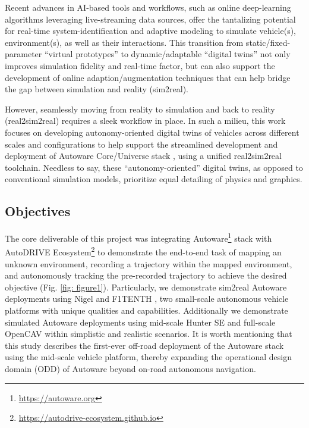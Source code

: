 Recent advances in AI-based tools and workflows, such as online deep-learning algorithms leveraging live-streaming data sources, offer the tantalizing potential for real-time system-identification and adaptive modeling to simulate vehicle(s), environment(s), as well as their interactions. This transition from static/fixed-parameter ``virtual prototypes'' to dynamic/adaptable ``digital twins'' not only improves simulation fidelity and real-time factor, but can also support the development of online adaption/augmentation techniques that can help bridge the gap between simulation and reality (sim2real).

However, seamlessly moving from reality to simulation and back to reality (real2sim2real) \cite{Real2Sim2Real} requires a sleek workflow in place. In such a milieu, this work focuses on developing autonomy-oriented digital twins of vehicles across different scales and configurations to help support the streamlined development and deployment of Autoware Core/Universe stack \cite{AutowareCore, AutowareUniverse, AutowareStack}, using a unified real2sim2real toolchain. Needless to say, these ``autonomy-oriented'' digital twins, as opposed to conventional simulation models, prioritize equal detailing of physics and graphics.

\hypertarget{Objectives}{%
\subsection{Objectives}\label{Objectives}}

The core deliverable of this project was integrating Autoware\footnote{\url{https://autoware.org}} \cite{Autoware} stack with AutoDRIVE Ecosystem\footnote{\url{https://autodrive-ecosystem.github.io}} \cite{AutoDRIVEEcosystem, AutoDRIVESimulator, AutoDRIVEReport, AutoDRIVESimulatorReport} to demonstrate the end-to-end task of mapping an unknown environment, recording a trajectory within the mapped environment, and autonomously tracking the pre-recorded trajectory to achieve the desired objective (Fig. \ref{fig: figure1}). Particularly, we demonstrate sim2real Autoware deployments using Nigel \cite{Nigel} and F1TENTH \cite{F1TENTH}, two small-scale autonomous vehicle platforms with unique qualities and capabilities. Additionally we demonstrate simulated Autoware deployments using mid-scale Hunter SE \cite{HunterSE} and full-scale OpenCAV \cite{OpenCAV} within simplistic and realistic scenarios. It is worth mentioning that this study describes the first-ever off-road deployment of the Autoware stack using the mid-scale vehicle platform, thereby expanding the operational design domain (ODD) of Autoware beyond on-road autonomous navigation.

